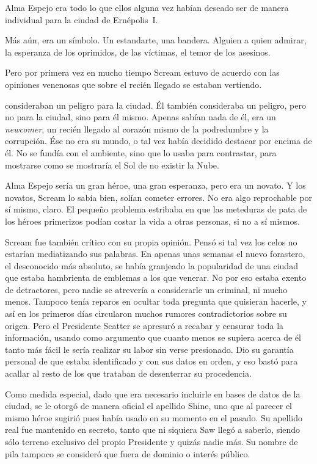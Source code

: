 Alma Espejo era todo lo que ellos alguna vez habían deseado ser de manera individual para la ciudad de Ernépolis~I.

Más aún, era un símbolo. Un estandarte, una bandera. Alguien a quien admirar, la esperanza de los oprimidos, de las víctimas, el temor de los asesinos.

Pero por primera vez en mucho tiempo Scream estuvo de acuerdo con las opiniones venenosas que sobre el recién llegado se estaban vertiendo.

 consideraban un peligro para la ciudad. Él también  consideraba un peligro, pero no para la ciudad, sino para él mismo. Apenas sabían nada de él, era un \emph{newcomer}, un recién llegado al corazón mismo de la podredumbre y la corrupción. Ése no era su mundo, o tal vez había decidido destacar por encima de él. No se fundía con el ambiente, sino que lo usaba para contrastar, para mostrarse como se mostraría el Sol de no existir la Nube.

Alma Espejo sería un gran héroe, una gran esperanza, pero era un novato. Y los novatos, Scream lo sabía bien, solían cometer errores. No era algo reprochable por sí mismo, claro. El pequeño problema estribaba en que las meteduras de pata de los héroes primerizos podían costar la vida a otras personas, si no a sí mismos.

Scream fue también crítico con su propia opinión. Pensó si tal vez los celos no estarían mediatizando sus palabras. En apenas unas semanas el nuevo forastero, el desconocido más absoluto, se había granjeado la popularidad de una ciudad que estaba hambrienta de emblemas a los que venerar. No por eso estaba exento de detractores, pero nadie se atrevería a considerarle un criminal, ni mucho menos. Tampoco tenía reparos en ocultar toda pregunta que quisieran hacerle, y así en los primeros días circularon muchos rumores contradictorios sobre su origen. Pero el Presidente Scatter se apresuró a recabar y censurar toda la información, usando como argumento que cuanto menos se supiera acerca de él tanto más fácil le sería realizar su labor sin verse presionado. Dio su garantía personal de que estaba identificado y con sus datos en orden, y eso bastó para acallar al resto de los que trataban de desenterrar su procedencia.

Como medida especial, dado que era necesario incluirle en bases de datos de la ciudad, se le otorgó de manera oficial el apellido Shine, uno que al parecer el mismo héroe sugirió pues había usado en su momento en el pasado. Su apellido real fue mantenido en secreto, tanto que ni siquiera Saw llegó a saberlo, siendo sólo terreno exclusivo del propio Presidente y quizás nadie más. Su nombre de pila tampoco se consideró que fuera de dominio o interés público.

